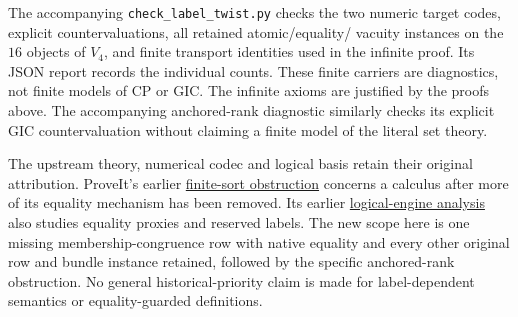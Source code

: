 The accompanying \texttt{check\_label\_twist.py} checks the two numeric
target codes, explicit countervaluations, all retained atomic/equality/
vacuity instances on the $16$ objects of $V_4$, and finite transport
identities used in the infinite proof. Its JSON report records the
individual counts. These finite carriers are diagnostics, not finite
models of CP or GIC. The infinite axioms are justified by the proofs
above. The accompanying anchored-rank diagnostic similarly checks its
explicit GIC countervaluation without claiming a finite model of the
literal set theory.

The upstream theory, numerical codec and logical basis retain their
original attribution. ProveIt's earlier
\href{https://github.com/VladimirReshetnikov/ProveIt/blob/6446ff5668307a2ac6aee1896037f0b792090389/Computability/BusyBeaver/Research/ZFC/typed_countermodel.md}{finite-sort obstruction}
concerns a calculus after more of its equality mechanism has been
removed. Its earlier
\href{https://github.com/VladimirReshetnikov/ProveIt/blob/6446ff5668307a2ac6aee1896037f0b792090389/Computability/BusyBeaver/Research/ZFC/logical_engine_completeness.md}{logical-engine analysis}
also studies equality proxies and reserved labels. The new scope here is
one missing membership-congruence row with native equality and every
other original row and bundle instance retained, followed by the
specific anchored-rank obstruction. No general historical-priority claim
is made for label-dependent semantics or equality-guarded definitions.
